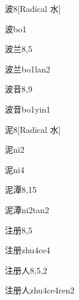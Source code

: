 \begin{entry}{波}{8}[Radical 水]
  \begin{phonetics}{波}{bo1}
  \end{phonetics}
\end{entry}

\begin{entry}{波兰}{8,5}
  \begin{phonetics}{波兰}{bo1lan2}
  \end{phonetics}
\end{entry}

\begin{entry}{波音}{8,9}
  \begin{phonetics}{波音}{bo1yin1}
  \end{phonetics}
\end{entry}

\begin{entry}{泥}{8}[Radical 水]
  \begin{phonetics}{泥}{ni2}
  \end{phonetics}
  \begin{phonetics}{泥}{ni4}
  \end{phonetics}
\end{entry}

\begin{entry}{泥潭}{8,15}
  \begin{phonetics}{泥潭}{ni2tan2}
  \end{phonetics}
\end{entry}

\begin{entry}{注册}{8,5}
  \begin{phonetics}{注册}{zhu4ce4}
  \end{phonetics}
\end{entry}

\begin{entry}{注册人}{8,5,2}
  \begin{phonetics}{注册人}{zhu4ce4ren2}
  \end{phonetics}
\end{entry}

